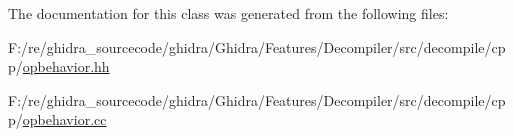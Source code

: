 The documentation for this class was generated from the following files\+:\begin{DoxyCompactItemize}
\item 
F\+:/re/ghidra\+\_\+sourcecode/ghidra/\+Ghidra/\+Features/\+Decompiler/src/decompile/cpp/\mbox{\hyperlink{opbehavior_8hh}{opbehavior.\+hh}}\item 
F\+:/re/ghidra\+\_\+sourcecode/ghidra/\+Ghidra/\+Features/\+Decompiler/src/decompile/cpp/\mbox{\hyperlink{opbehavior_8cc}{opbehavior.\+cc}}\end{DoxyCompactItemize}
